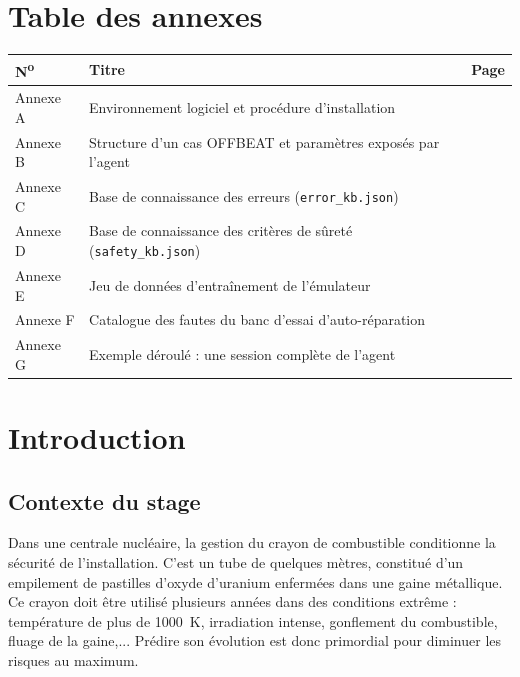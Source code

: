 \documentclass[12pt,a4paper,french]{report}
\begin{document}
\renewcommand{\listtablename}{Liste des tableaux}
\listoftables
{}
\clearpage

\chapter*{Table des annexes}
\noindent
\begin{tabularx}{\textwidth}{@{}lXr@{}}
\toprule
\textbf{N\textsuperscript{o}} & \textbf{Titre} & \textbf{Page}\\
\midrule
Annexe A & Environnement logiciel et procédure d'installation
           & \pageref{ann:install}\\
Annexe B & Structure d'un cas OFFBEAT et paramètres exposés par l'agent
           & \pageref{ann:cas}\\
Annexe C & Base de connaissance des erreurs (\texttt{error\_kb.json})
           & \pageref{ann:errkb}\\
Annexe D & Base de connaissance des critères de sûreté
           (\texttt{safety\_kb.json}) & \pageref{ann:safetykb}\\
Annexe E & Jeu de données d'entraînement de l'émulateur
           & \pageref{ann:dataset}\\
Annexe F & Catalogue des fautes du banc d'essai d'auto-réparation
           & \pageref{ann:bench}\\
Annexe G & Exemple déroulé : une session complète de l'agent
           & \pageref{ann:session}\\
\bottomrule
\end{tabularx}

\clearpage

\chapter*{Introduction}

\section*{Contexte du stage}

Dans une centrale nucléaire, la gestion du crayon de combustible conditionne la sécurité de l'installation. C'est un
tube de quelques mètres, constitué d'un empilement de pastilles d'oxyde
d'uranium enfermées dans une gaine métallique. Ce crayon doit être utilisé plusieurs années dans des conditions extrême : température de plus de \SI{1000}{\kelvin},
irradiation intense, gonflement du combustible, fluage de la gaine,... Prédire son
évolution est donc primordial pour diminuer les risques au maximum.
\end{document}
